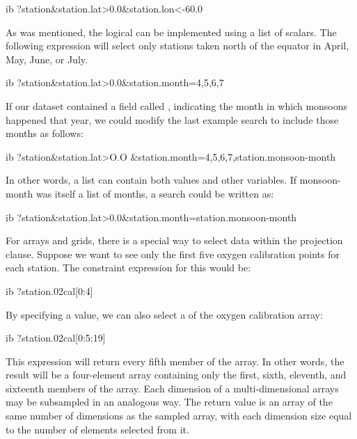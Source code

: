 \begin{vcode}{ib}
?station&station.lat>0.0&station.lon<-60.0
\end{vcode}

As was mentioned, the logical  can be implemented using a list
of scalars. The following expression will select only stations taken
north of the equator in April, May, June, or July.

\begin{vcode}{ib}
?station&station.lat>0.0&station.month={4,5,6,7}
\end{vcode}

If our dataset contained a field called ,
indicating the month in which monsoons happened that year, we could
modify the last example search to include those months as follows:

\begin{vcode}{ib}
?station&station.lat>O.O
        &station.month={4,5,6,7,station.monsoon-month}
\end{vcode}

In other words, a list can contain both values and other variables. If
monsoon-month was itself a list of months, a search could be written
as:

\begin{vcode}{ib}
?station&station.lat>0.0&station.month=station.monsoon-month
\end{vcode}

 
  For arrays
and grids, there is a special way to select data within the projection
clause.  Suppose we want to see only the first five oxygen calibration
points for each station. The constraint expression for this would be:
\label{opd-client,array-op}

\begin{vcode}{ib}
?station.02cal[0:4]
\end{vcode}
\label{opd-client,CE,array-sel}

By specifying a  value, we can also select a
 of the oxygen calibration array:
 
 

\begin{vcode}{ib}
?station.02cal[0:5:19]
\end{vcode}

This expression will return every fifth member of the 
array. In other words, the result will be a four-element array
containing only the first, sixth, eleventh, and sixteenth members of
the  array. Each dimension of a multi-dimensional arrays
may be subsampled in an analogous way. The return value is an array of
the same number of dimensions as the sampled array, with each
dimension size equal to the number of elements selected from it.

